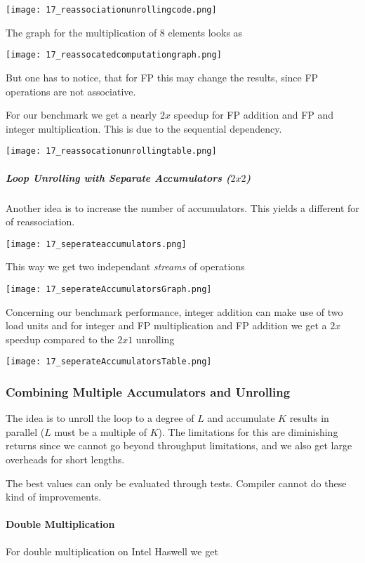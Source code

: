 \texttt{[image: 17\_reassociationunrollingcode.png]}

The graph for the multiplication of $8$ elements looks as

\texttt{[image: 17\_reassocatedcomputationgraph.png]}


But one has to notice, that for FP this may change the results, since FP operations are not associative.

For our benchmark we get a nearly $2x$ speedup for FP addition and FP and integer multiplication. This is due to the sequential dependency.

\texttt{[image: 17\_reassocationunrollingtable.png]}

\subparagraph{Loop Unrolling with Separate Accumulators ($2x2$)}
Another idea is to increase the number of accumulators. This yields a different for of reassociation.

\texttt{[image: 17\_seperateaccumulators.png]}

This way we get two independant \textit{streams} of operations

\texttt{[image: 17\_seperateAccumulatorsGraph.png]}

Concerning our benchmark performance, integer addition can make use of two load units and for integer and FP multiplication and FP addition we get a $2x$ speedup compared to the $2x1$ unrolling

\texttt{[image: 17\_seperateAccumulatorsTable.png]}

\subsubsection{Combining Multiple Accumulators and Unrolling}
The idea is to unroll the loop to a degree of $L$ and accumulate $K$ results in parallel ($L$ must be a multiple of $K$). The limitations for this are diminishing returns since we cannot go beyond throughput limitations, and we also get large overheads for short lengths.

The best values can only be evaluated through tests. Compiler cannot do these kind of improvements.

\paragraph{Double Multiplication}
For double multiplication on Intel Haswell we get

